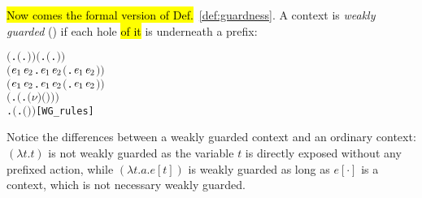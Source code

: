 \hl{Now comes the formal version of Def.}~\ref{def:guardness}.
A context is \emph{weakly guarded} () if each hole \hl{of
  it} is underneath a prefix:
\begin{alltt}
\HOLTokenTurnstile{} \ensuremath{(}\HOLSymConst{\HOLTokenForall{}}.  \ensuremath{(}\HOLTokenLambda{}. \ensuremath{)}\ensuremath{)} \HOLSymConst{\HOLTokenConj{}} \ensuremath{(}\HOLSymConst{\HOLTokenForall{}} .   \HOLSymConst{\HOLTokenImp{}}  \ensuremath{(}\HOLTokenLambda{}. \HOLSymConst{\ensuremath{\ldotp}} \ensuremath{)}\ensuremath{)} \HOLSymConst{\HOLTokenConj{}}
   \ensuremath{(}\HOLSymConst{\HOLTokenForall{}}\ensuremath{\HOLBoundVar{e}\sb{\mathrm{1}}} \ensuremath{\HOLBoundVar{e}\sb{\mathrm{2}}}.  \ensuremath{\HOLBoundVar{e}\sb{\mathrm{1}}} \HOLSymConst{\HOLTokenConj{}}  \ensuremath{\HOLBoundVar{e}\sb{\mathrm{2}}} \HOLSymConst{\HOLTokenImp{}}  \ensuremath{(}\HOLTokenLambda{}. \ensuremath{\HOLBoundVar{e}\sb{\mathrm{1}}}  \HOLSymConst{\ensuremath{+}} \ensuremath{\HOLBoundVar{e}\sb{\mathrm{2}}} \ensuremath{)}\ensuremath{)} \HOLSymConst{\HOLTokenConj{}}
   \ensuremath{(}\HOLSymConst{\HOLTokenForall{}}\ensuremath{\HOLBoundVar{e}\sb{\mathrm{1}}} \ensuremath{\HOLBoundVar{e}\sb{\mathrm{2}}}.  \ensuremath{\HOLBoundVar{e}\sb{\mathrm{1}}} \HOLSymConst{\HOLTokenConj{}}  \ensuremath{\HOLBoundVar{e}\sb{\mathrm{2}}} \HOLSymConst{\HOLTokenImp{}}  \ensuremath{(}\HOLTokenLambda{}. \ensuremath{\HOLBoundVar{e}\sb{\mathrm{1}}}  \HOLSymConst{\ensuremath{\mid}} \ensuremath{\HOLBoundVar{e}\sb{\mathrm{2}}} \ensuremath{)}\ensuremath{)} \HOLSymConst{\HOLTokenConj{}}
   \ensuremath{(}\HOLSymConst{\HOLTokenForall{}} .   \HOLSymConst{\HOLTokenImp{}}  \ensuremath{(}\HOLTokenLambda{}. \ensuremath{(\nu}\ensuremath{)} \ensuremath{(} \ensuremath{)}\ensuremath{)}\ensuremath{)} \HOLSymConst{\HOLTokenConj{}}
   \HOLSymConst{\HOLTokenForall{}} .   \HOLSymConst{\HOLTokenImp{}}  \ensuremath{(}\HOLTokenLambda{}.  \ensuremath{(} \ensuremath{)} \ensuremath{)}\hfill{[WG_rules]}
\end{alltt}
Notice the differences between a weakly guarded context and an
ordinary context: $(\lambda t. t)$ is not weakly guarded as the
variable $t$ is directly
exposed without any prefixed action, while $(\lambda t. a.e[t])$ is weakly
guarded as long as $e[\cdot]$ is a context, which is not necessary weakly guarded.

